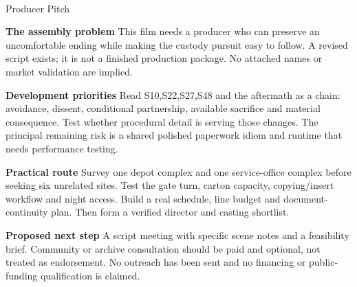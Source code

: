 \documentclass[11pt,letterpaper]{article}
\begin{document}
\begin{center}
{\Large\bfseries\sffamily \filmtitleupper}\\[6pt]
Producer Pitch
\end{center}
\textbf{The assembly problem} This film needs a producer who can preserve an uncomfortable ending while making the custody pursuit easy to follow. A revised script exists; it is not a finished production package. No attached names or market validation are implied.

\textbf{Development priorities} Read S10,S22,S27,S48 and the aftermath as a chain: avoidance, dissent, conditional partnership, available sacrifice and material consequence. Test whether procedural detail is serving those changes. The principal remaining risk is a shared polished paperwork idiom and runtime that needs performance testing.

\textbf{Practical route} Survey one depot complex and one service-office complex before seeking six unrelated sites. Test the gate turn, carton capacity, copying/insert workflow and night access. Build a real schedule, line budget and document-continuity plan. Then form a verified director and casting shortlist.

\textbf{Proposed next step} A script meeting with specific scene notes and a feasibility brief. Community or archive consultation should be paid and optional, not treated as endorsement. No outreach has been sent and no financing or public-funding qualification is claimed.
\end{document}
